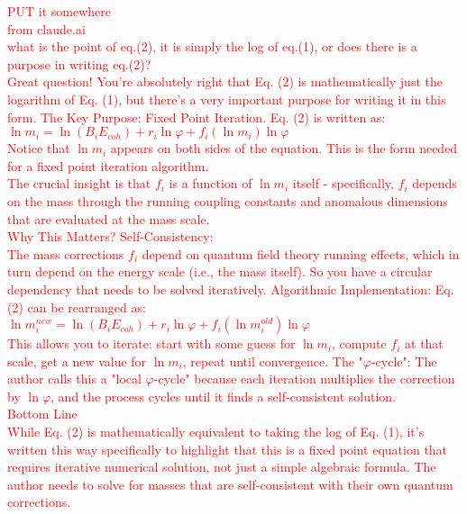 \documentclass[%
 amsmath,amssymb,
 aps,
prb,
floatfix, showkeys
]{revtex4-2}
\newcommand{\need}[1]{\textcolor{red}{#1}}
\begin{document}
{\need{ PUT it somewhere \\
from claude.ai \\
what is the point of eq.(2), it is simply the log of eq.(1), or does there is a purpose in writing eq.(2)? \\
Great question! You're absolutely right that Eq. (2) is mathematically just the logarithm of Eq. (1),
but there's a very important purpose for writing it in this form. The Key Purpose: Fixed Point Iteration.
Eq. (2) is written as: \\
$ \ln m_i = \ln(B_i E_{coh}) + r_i \ln \varphi + f_i(\ln m_i) \ln \varphi$ \\
Notice that $\ln m_i$ appears on both sides of the equation. This is the form needed for a fixed point iteration algorithm. \\
The crucial insight is that $f_i$ is a function of $\ln m_i$ itself - specifically, $f_i$
depends on the mass through the running coupling constants and anomalous dimensions that are evaluated at the mass scale. \\
Why This Matters?  Self-Consistency: \\
The mass corrections $f_i$ depend on quantum field theory running effects, which in turn depend on the energy
scale (i.e., the mass itself). So you have a circular dependency that needs to be solved iteratively.
    Algorithmic Implementation: Eq. (2) can be rearranged as: \\
$ \ln m_i^{new} = \ln(B_i E_{coh}) + r_i \ln \varphi + f_i(\ln m_i^{old}) \ln \varphi$ \\
    This allows you to iterate: start with some guess for  $\ln m_i$, compute $f_i$ at that scale,
    get a new value for $\ln m_i$, repeat until convergence.     The "$\varphi$-cycle":
    The author calls this a "local $\varphi$-cycle" because each iteration multiplies the correction by
    $\ln \varphi$, and the process cycles until it finds a self-consistent solution. \\
Bottom Line \\
While Eq. (2) is mathematically equivalent to taking the log of Eq. (1), it's written this way
specifically to highlight that this is a fixed point equation that requires iterative numerical solution,
not just a simple algebraic formula. The author needs to solve for masses that are
self-consistent with their own quantum corrections.
}}
\end{document}
